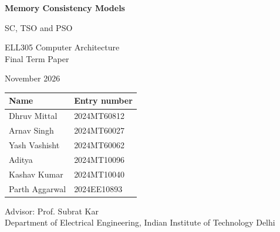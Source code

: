\newcommand{\fourpanels}[3]{%
\begin{tikzpicture}[scale=0.9, transform shape]
  \begin{scope}[shift={(0,0)}]
    \node[font=\small\bfseries] at (1.9,4.2) {1. program order};
    #1{p}{1}{#2}{#3}
  \end{scope}
  \begin{scope}[shift={(7.0,0)}]
    \node[font=\small\bfseries] at (1.9,4.2) {2. add reads-from};
    #1{q}{2}{#2}{#3}
  \end{scope}
  \begin{scope}[shift={(0,-6.8)}]
    \node[font=\small\bfseries] at (1.9,4.2) {3. add coherence order};
    #1{r}{3}{#2}{#3}
  \end{scope}
  \begin{scope}[shift={(7.0,-6.8)}]
    \node[font=\small\bfseries] at (1.9,4.2) {4. add from-read};
    #1{s}{4}{#2}{#3}
  \end{scope}
\end{tikzpicture}}



\begin{titlepage}
\centering
\vspace*{1.2cm}
{\LARGE\bfseries Memory Consistency Models\par}
\vspace{0.5cm}
{\Large SC, TSO and PSO\par}
\vspace{0.8cm}
{\large ELL305 Computer Architecture\\ Final Term Paper\par}
\vspace{1.6cm}
{\large November 2026\par}
\vspace{1.8cm}
\begin{tabular}{ll}
\toprule
\textbf{Name} & \textbf{Entry number}\\
\midrule
Dhruv Mittal & 2024MT60812\\
Arnav Singh & 2024MT60027\\
Yash Vashisht & 2024MT60062\\
Aditya & 2024MT10096\\
Kashav Kumar & 2024MT10040\\
Parth Aggarwal & 2024EE10893\\
\bottomrule
\end{tabular}
\vfill
{Advisor: Prof. Subrat Kar\\
Department of Electrical Engineering, Indian Institute of Technology Delhi\par}
\vspace{0.6cm}
\end{titlepage}
\setcounter{page}{2}

